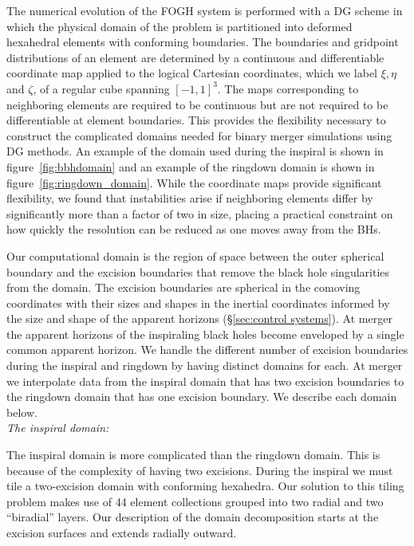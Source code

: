 \begin{bibunit}[unsrtnat]
The numerical evolution of the FOGH system is performed with a DG scheme in which
the physical domain of the problem is partitioned into deformed hexahedral
elements with conforming boundaries. The boundaries and gridpoint distributions
of an element are determined by a continuous and differentiable coordinate map
applied to the logical Cartesian coordinates, which we label $\xi, \eta$ and
$\zeta$, of a regular cube spanning $[-1,1]^3$. The maps corresponding to
neighboring elements are required to be continuous but are not required to be
differentiable at
element boundaries. This provides the flexibility necessary to construct the
complicated domains needed for binary merger simulations using DG methods. An
example of the domain used during the inspiral is shown in
figure~\ref{fig:bbhdomain} and an example of the ringdown domain is shown in
figure~\ref{fig:ringdown_domain}. While the coordinate maps provide
significant flexibility, we found that instabilities arise if neighboring
elements differ by significantly more than a factor of two in size, placing a
practical constraint on how quickly the resolution can be reduced as one moves
away from the BHs.

Our computational domain is the region of space between the outer spherical
boundary and the excision boundaries that remove the black hole singularities
from the domain. The excision boundaries are spherical in the comoving
coordinates with their sizes and shapes in the inertial coordinates informed by
the size and shape of the apparent horizons (\S\ref{sec:control systems}). At
merger the apparent horizons of
the inspiraling black holes become enveloped by a single common apparent
horizon.  We handle the different number of excision boundaries during the
inspiral and ringdown by having distinct domains for each. At merger we
interpolate data from the inspiral domain that has two excision boundaries to
the ringdown domain that has one excision boundary.  We describe each domain
below.
\\

\noindent\textit{The inspiral domain:}

The inspiral domain is more complicated than the ringdown domain. This is
because of the complexity of having two excisions. During the
inspiral we must tile a two-excision domain with conforming hexahedra. Our
solution to this tiling problem makes use of 44 element collections grouped
into two radial and two ``biradial'' layers. Our description of the domain
decomposition starts at the excision surfaces and extends radially outward.


\end{bibunit}
